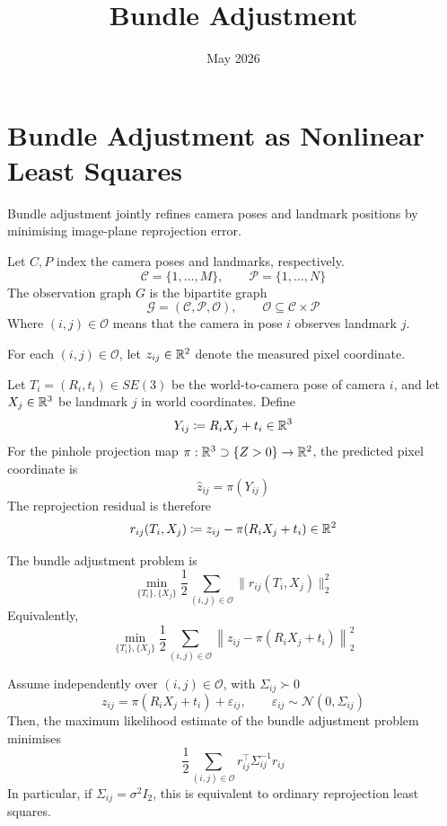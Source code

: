 \documentclass[11pt]{article}
\title{Bundle Adjustment}
\date{May 2026}
\begin{document}
\maketitle

\tableofcontents

\section{Bundle Adjustment as Nonlinear Least Squares}

Bundle adjustment jointly refines camera poses and landmark positions by minimising image-plane reprojection error.

\begin{definition}
Let \( C, P \) index the camera poses and landmarks, respectively. 
\[
\mathcal C=\{1,\dots,M\},\qquad \mathcal P=\{1,\dots,N\}
\]
The observation graph \( G \) is the bipartite graph
\[
\mathcal G=(\mathcal C,\mathcal P,\mathcal O),
\qquad
\mathcal O\subseteq \mathcal C\times \mathcal P
\]
Where \((i,j)\in\mathcal O\) means that the camera in pose \(i\) observes landmark \(j\).

For each \((i,j)\in\mathcal O\), let \(z_{ij}\in\mathbb{R}^2\) denote the measured pixel coordinate.
\end{definition}

\begin{definition}
Let \(T_i=(R_i,t_i)\in SE(3)\) be the world-to-camera pose of camera \(i\), and let \(X_j\in\mathbb{R}^3\) be landmark \(j\) in world coordinates. Define
\[
Y_{ij}\coloneqq R_iX_j+t_i\in\mathbb{R}^3
\]
For the pinhole projection map \(\pi:\mathbb{R}^3\supset\{Z>0\}\to\mathbb{R}^2\), the predicted pixel coordinate is
\[
\hat z_{ij}=\pi(Y_{ij})
\]
The reprojection residual is therefore
\[
r_{ij}(T_i,X_j)
\coloneqq
z_{ij}-\pi(R_iX_j+t_i)
\in\mathbb{R}^2
\]
\end{definition}

\begin{definition}
The bundle adjustment problem is
\[
\min_{\{T_i\},\{X_j\}}
\frac12
\sum_{(i,j)\in\mathcal O}
\|r_{ij}(T_i,X_j)\|_2^2
\]
Equivalently,
\[
\min_{\{T_i\},\{X_j\}}
\frac12
\sum_{(i,j)\in\mathcal O}
\left\|
z_{ij}-\pi(R_iX_j+t_i)
\right\|_2^2
\]
\end{definition}

\begin{proposition}
Assume independently over \((i,j)\in\mathcal O\), with \(\Sigma_{ij}\succ0\)
\[
z_{ij}=\pi(R_iX_j+t_i)+\varepsilon_{ij},
\qquad
\varepsilon_{ij}\sim\mathcal N(0,\Sigma_{ij})
\]
Then, the maximum likelihood estimate of the bundle adjustment problem minimises
\[
\frac12
\sum_{(i,j)\in\mathcal O}
r_{ij}^{\top}\Sigma_{ij}^{-1}r_{ij}
\]
In particular, if \(\Sigma_{ij}=\sigma^2I_2\), this is equivalent to ordinary reprojection least squares.
\end{proposition}
\end{document}
